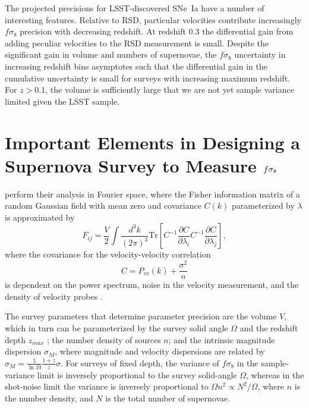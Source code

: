 \documentclass{aastex62}   	%
\begin{document}
The projected precisions for LSST-discovered SNe~Ia have a number of interesting features.  Relative to
RSD, particular velocities contribute increasingly 
$f\sigma_8$ precision with decreasing redshift.  At redshift 0.3 the differential gain from adding peculiar velocities to the RSD measurement is small.
Despite the significant gain in volume and numbers of supernovae, the $f\sigma_8$ uncertainty in increasing redshift bins asymptotes such that
the differential gain in the cumulative  uncertainty is small for surveys with increasing maximum redshift.
For $z>0.1$, the volume is sufficiently large that we are not yet sample variance limited  given the LSST sample.

\section{Important Elements in Designing a Supernova Survey to Measure $\MakeLowercase{f}\sigma_8$}
\citet{2017ApJ...847..128H} perform their analysis in Fourier space, 
where the Fisher information matrix of a random Gaussian field with mean zero and covariance $C(k)$ parameterized by $\lambda$ is
approximated by
\begin{equation}
F_{ij} = \frac{V}{2}\int \frac{d^3k}{(2\pi)^3} \text{Tr}\left[ C^{-1} \frac{\partial C}{\partial \lambda_i} C^{-1}
\frac{\partial C}{\partial \lambda_j} \right],
\end{equation}
where the covariance for the velocity-velocity correlation
\begin{equation}
C = P_{vv}(k) + \frac{\sigma^2}{n}
\label{cov:eq}
\end{equation}
is dependent on the power spectrum, noise in the velocity measurement, and the density of velocity probes
\citep{2017MNRAS.464.2517H}. 

The survey parameters that determine parameter precision are the volume $V$, which
in turn can be parameterized by the survey solid angle $\Omega$ and the redshift depth $z_{max}$ ; the number density of sources $n$; and the intrinsic
magnitude dispersion $\sigma_M$, where magnitude and velocity dispersions are related by $\sigma_{M} = \frac{5}{\ln{10}} \frac{1+z}{z} \sigma$.
For surveys of fixed depth, the variance of $f\sigma_8$ 
in the sample-variance limit  
is inversely proportional to the survey solid-angle $\Omega$, whereas
in the shot-noise limit the variance is inversely proportional to $\Omega n^2 \propto N^2/\Omega$, where $n$ is the number density,
and $N$ is the total number of supernovae.  
\end{document}
